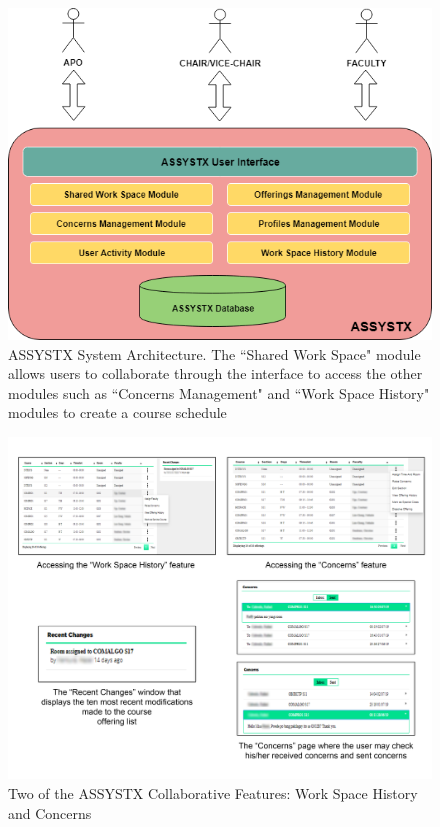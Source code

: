\begin{figure}[h]
   \centering
   \includegraphics[scale=0.4]{Diagrams/System_Architecture.png}
   \caption{ASSYSTX System Architecture. The ``Shared Work Space" module allows users to collaborate through the interface to access the other modules such as ``Concerns Management" and ``Work Space History" modules to create a course schedule}
    \label{fig:pipelinediagram}
\end{figure}
\begin{figure}[h]
   \centering
 \includegraphics[width=\textwidth,height=\textheight,keepaspectratio]{PCSC2019_latex/Screenshots/assystxScreenshots.png}
   \caption{Two of the ASSYSTX Collaborative Features: Work Space History and Concerns} \label{fig:assystxScreenshot}
\end{figure}
